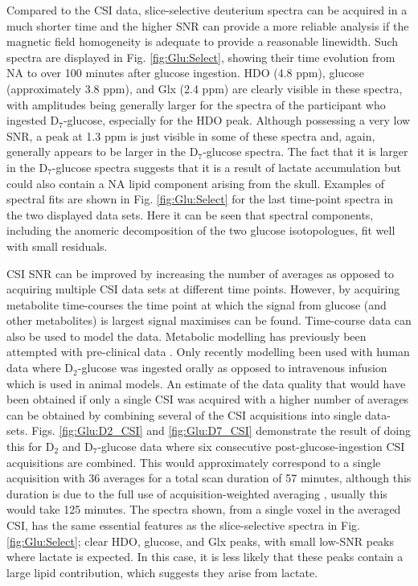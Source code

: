  Compared to the \ac{CSI} data, slice-selective deuterium spectra can be acquired in a much shorter time and the higher \ac{SNR} can provide a more reliable analysis if the magnetic field homogeneity is adequate to provide a reasonable linewidth. Such spectra are displayed in Fig. \ref{fig:Glu:Select}, showing their time evolution from \ac{NA} to over 100 minutes after glucose ingestion. HDO (4.8 ppm), glucose (approximately 3.8 ppm), and Glx (2.4 ppm) are clearly visible in these spectra, with amplitudes being generally larger for the spectra of the participant who ingested D$_7$-glucose, especially for the \ac{HDO} peak. Although possessing a very low \ac{SNR}, a peak at 1.3 ppm is just visible in some of these spectra and, again, generally appears to be larger in the D$_7$-glucose spectra. The fact that it is larger in the D$_7$-glucose spectra suggests that it is a result of lactate accumulation but could also contain a \ac{NA} lipid component arising from the skull. Examples of spectral fits are shown in Fig. \ref{fig:Glu:Select} for the last time-point spectra in the two displayed data sets. Here it can be seen that spectral components, including the anomeric decomposition of the two glucose isotopologues, fit well with small residuals.

\ac{CSI} \ac{SNR} can be improved by increasing the number of averages as opposed to acquiring multiple \ac{CSI} data sets at different time points. However, by acquiring metabolite time-courses the time point at which the signal from glucose (and other metabolites) is largest signal maximises can be found. Time-course data can also be used to model the data. Metabolic modelling has previously been attempted with pre-clinical data \cite{Lu2017QuantitativeSpectroscopy, Rich20201HVivo, Kreis2020MeasuringMRI, Simoes2022GlucoseGlioblastoma}. Only recently modelling been used with human data where D$_2$-glucose was ingested orally \cite{Ruhm2022Dynamic9.4T} as opposed to intravenous infusion which is used in animal models. An estimate of the data quality that would have been obtained if only a single \ac{CSI} was acquired with a higher number of averages can be obtained by combining several of the \ac{CSI} acquisitions into single data-sets. Figs. \ref{fig:Glu:D2_CSI} and \ref{fig:Glu:D7_CSI} demonstrate the result of doing this for D$_2$ and D$_7$-glucose data where six consecutive post-glucose-ingestion \ac{CSI} acquisitions are combined. This would approximately correspond to a single acquisition with 36 averages for a total scan duration of 57 minutes, although this duration is due to the full use of acquisition-weighted averaging \cite{Pohmann2001AccurateCSI}, usually this would take 125 minutes. The spectra shown, from a single voxel in the averaged \ac{CSI}, has the same essential features as the slice-selective spectra in Fig. \ref{fig:Glu:Select}; clear \ac{HDO}, glucose, and Glx peaks, with small low-\ac{SNR} peaks where lactate is expected. In this case, it is less likely that these peaks contain a large lipid contribution, which suggests they arise from lactate. 

